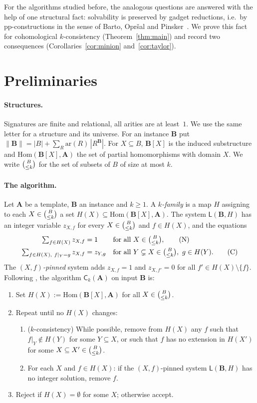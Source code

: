 \documentclass[11pt]{article}
\theoremstyle{definition}
\theoremstyle{remark}
\newcommand{\Hom}{\mathrm{Hom}}
\newcommand{\Coh}{\mathsf{C}}
\newcommand{\sub}[2]{\tbinom{#1}{\le #2}}
\newcommand{\size}[1]{\lVert #1\rVert}
\begin{document}
For the algorithms studied before, the analogous questions are answered with
the help of one structural fact: solvability is preserved by gadget
reductions, i.e.\ by pp-constructions in the sense of Barto, Opr\v{s}al and
Pinsker~\cite{BOP18}. We prove this fact for cohomological $k$-consistency
(Theorem~\ref{thm:main}) and record two consequences
(Corollaries~\ref{cor:minion} and~\ref{cor:taylor}).

\section{Preliminaries}

\paragraph{Structures.} Signatures are finite and relational, all arities are
at least~$1$. We use the same letter for a structure and its universe. For an
instance $\mathbf B$ put
$\size{\mathbf B} = |B| + \sum_R \mathrm{ar}(R)\,|R^{\mathbf B}|$. For
$X\subseteq B$, $\mathbf B[X]$ is the induced substructure and
$\Hom(\mathbf B[X],\mathbf A)$ the set of partial homomorphisms with domain
$X$. We write $\sub{B}{k}$ for the set of subsets of $B$ of size at most $k$.

\paragraph{The algorithm.} Let $\mathbf A$ be a template, $\mathbf B$ an
instance and $k\ge 1$. A \emph{$k$-family} is a map $H$ assigning to each
$X\in\sub{B}{k}$ a set $H(X)\subseteq \Hom(\mathbf B[X],\mathbf A)$. The
system $\mathsf L(\mathbf B,H)$ has an integer variable $z_{X,f}$ for every
$X\in\sub Bk$ and $f\in H(X)$, and the equations
\begin{align}
  \textstyle\sum_{f\in H(X)} z_{X,f} &= 1 && \text{for all } X\in\sub Bk, \tag{N}\\
  \textstyle\sum_{f\in H(X),\ f|_Y=g} z_{X,f} &= z_{Y,g}
    && \text{for all } Y\subsetneq X\in\sub Bk,\ g\in H(Y). \tag{C}
\end{align}
The \emph{$(X,f)$-pinned} system adds $z_{X,f}=1$ and $z_{X,f'}=0$ for all
$f'\in H(X)\setminus\{f\}$. Following \cite[\S5.4]{LP25}, the algorithm
$\Coh_k(\mathbf A)$ on input $\mathbf B$ is:
\begin{enumerate}
\item Set $H(X) := \Hom(\mathbf B[X],\mathbf A)$ for all $X\in\sub Bk$.
\item Repeat until no $H(X)$ changes:
  \begin{enumerate}
  \item ($k$-consistency) While possible, remove from $H(X)$ any $f$ such
    that $f|_Y\notin H(Y)$ for some $Y\subseteq X$, or such that $f$ has no
    extension in $H(X')$ for some $X\subseteq X'\in\sub Bk$.
  \item For each $X$ and $f\in H(X)$: if the $(X,f)$-pinned system
    $\mathsf L(\mathbf B,H)$ has no integer solution, remove $f$.
  \end{enumerate}
\item Reject if $H(X)=\emptyset$ for some $X$; otherwise accept.
\end{enumerate}
\end{document}
